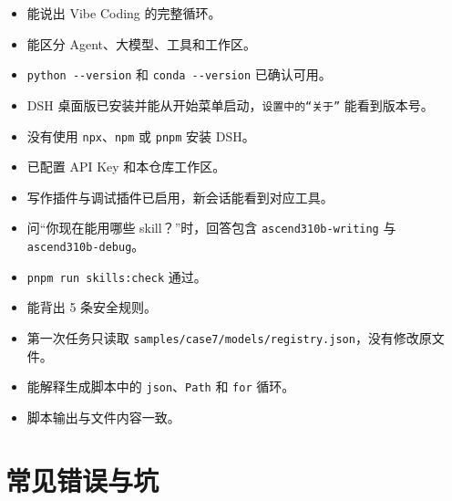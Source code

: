 \begin{itemize}
\tightlist
\item[$\square$]
  能说出 Vibe Coding 的完整循环。
\item[$\square$]
  能区分 Agent、大模型、工具和工作区。
\item[$\square$]
  \passthrough{\lstinline!python --version!} 和
  \passthrough{\lstinline!conda --version!} 已确认可用。
\item[$\square$]
  DSH
  桌面版已安装并能从开始菜单启动，\passthrough{\lstinline!设置中的“关于”!}
  能看到版本号。
\item[$\square$]
  没有使用 \passthrough{\lstinline!npx!}、\passthrough{\lstinline!npm!}
  或 \passthrough{\lstinline!pnpm!} 安装 DSH。
\item[$\square$]
  已配置 API Key 和本仓库工作区。
\item[$\square$]
  写作插件与调试插件已启用，新会话能看到对应工具。
\item[$\square$]
  问``你现在能用哪些 skill？''时，回答包含
  \passthrough{\lstinline!ascend310b-writing!} 与
  \passthrough{\lstinline!ascend310b-debug!}。
\item[$\square$]
  \passthrough{\lstinline!pnpm run skills:check!} 通过。
\item[$\square$]
  能背出 5 条安全规则。
\item[$\square$]
  第一次任务只读取
  \passthrough{\lstinline!samples/case7/models/registry.json!}，没有修改原文件。
\item[$\square$]
  能解释生成脚本中的
  \passthrough{\lstinline!json!}、\passthrough{\lstinline!Path!} 和
  \passthrough{\lstinline!for!} 循环。
\item[$\square$]
  脚本输出与文件内容一致。
\end{itemize}

\section{常见错误与坑}\label{src-appendix-appendix4-pitfalls}

